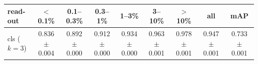 \begin{tabular}{lcccccccc}
\toprule
read-out & $<$0.1\% & 0.1--0.3\% & 0.3--1\% & 1--3\% & 3--10\% & $>$10\% & all & mAP \\
\midrule
cls ($k=3$) & 0.836 $\pm$ 0.004 & 0.892 $\pm$ 0.000 & 0.912 $\pm$ 0.000 & 0.934 $\pm$ 0.000 & 0.963 $\pm$ 0.001 & 0.978 $\pm$ 0.001 & 0.947 $\pm$ 0.001 & 0.733 $\pm$ 0.001 \\
\bottomrule
\end{tabular}
